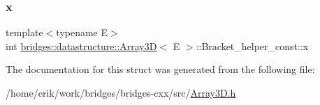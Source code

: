 \mbox{\label{structbridges_1_1datastructure_1_1_array3_d_1_1_bracket__helper__const_ae7538519eb75fa07fbd06ab9754b6727}} 
\subsubsection{\texorpdfstring{x}{x}}
{\footnotesize\ttfamily template$<$typename E$>$ \\
int \hyperlink{classbridges_1_1datastructure_1_1_array3_d}{bridges\+::datastructure\+::\+Array3D}$<$ E $>$\+::Bracket\+\_\+helper\+\_\+const\+::x}



The documentation for this struct was generated from the following file\+:\begin{DoxyCompactItemize}
\item 
/home/erik/work/bridges/bridges-\/cxx/src/\hyperlink{_array3_d_8h}{Array3\+D.\+h}\end{DoxyCompactItemize}
